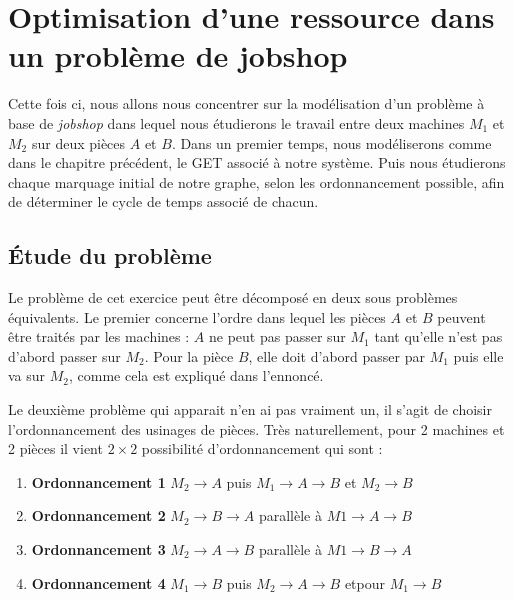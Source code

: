 \chapter{Optimisation d'une ressource dans un problème de jobshop}
Cette fois ci, nous allons nous concentrer sur la modélisation d'un problème à base de \emph{jobshop} dans lequel nous étudierons le travail entre deux machines $M_1$ et $M_2$ sur deux pièces $A$ et $B$. Dans un premier temps, nous modéliserons comme dans le chapitre précédent, le GET associé à notre système. Puis nous étudierons chaque marquage initial de notre graphe, selon les ordonnancement possible, afin de déterminer le cycle de temps associé de chacun.

\section{Étude du problème}



Le problème de cet exercice peut être décomposé en deux sous problèmes équivalents. Le premier concerne l'ordre dans lequel les pièces $A$ et $B$ peuvent être traités par les machines : $A$ ne peut pas passer sur $M_1$ tant qu'elle n'est pas d'abord passer sur $M_2$. Pour la pièce $B$, elle doit d'abord passer par $M_1$ puis elle va sur $M_2$, comme cela est expliqué dans l'ennoncé. 

Le deuxième problème qui apparait n'en ai pas vraiment un, il s'agit de choisir l'ordonnancement des usinages de pièces. Très naturellement, pour 2 machines et 2 pièces il vient $2\times 2$ possibilité d'ordonnancement qui sont : \begin{enumerate}
\item \label{item:o1}\textbf{Ordonnancement 1} $M_2 \rightarrow A$ puis $M_1 \rightarrow A \rightarrow B$ et  $M_2 \rightarrow B$ 
\item \label{item:o2}\textbf{Ordonnancement 2} $M_2 \rightarrow B \rightarrow A $ parallèle à $M1 \rightarrow A \rightarrow B$
\item \label{item:o3}\textbf{Ordonnancement 3}	$M_2 \rightarrow A \rightarrow B $ parallèle à $M1 \rightarrow B \rightarrow A$
\item \label{item:o4}\textbf{Ordonnancement 4}	$M_1 \rightarrow B$ puis $M_2 \rightarrow A \rightarrow B$ etpour   $M_1 \rightarrow B$
\end{enumerate}

